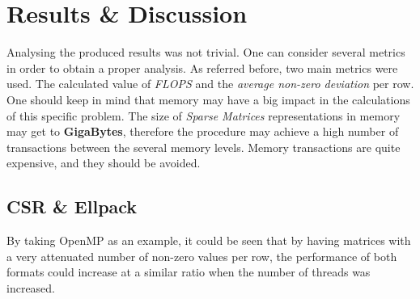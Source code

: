 \documentclass[12pt]{article}
\begin{document}
\section*{Results \& Discussion}

\par Analysing the produced results was not trivial. One can consider several metrics in order to obtain a proper analysis. As referred before, two main metrics were used. The calculated value of \textit{FLOPS} and the \textit{average non-zero deviation} per row. One should keep in mind that memory may have a big impact in the calculations of this specific problem. The size of \textit{Sparse Matrices} representations in memory may get to \textbf{GigaBytes}, therefore the procedure may achieve a high number of transactions between the several memory levels. Memory transactions are quite expensive, and they should be avoided.

\subsection*{CSR \& Ellpack}

\par By taking OpenMP as an example, it could be seen that by having matrices with a very attenuated number of non-zero values per row, the performance of both formats could increase at a similar ratio when the number of threads was increased.
\end{document}
